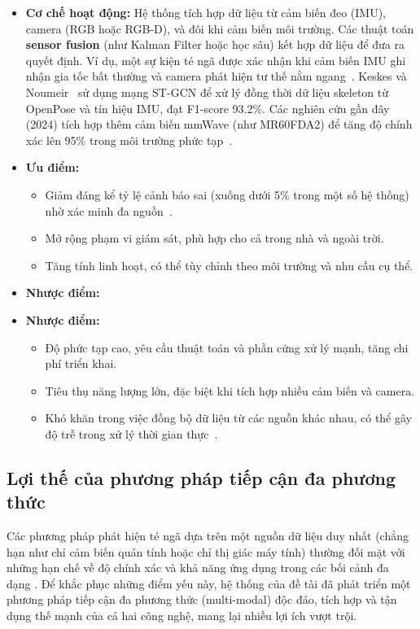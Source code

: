 \begin{itemize}
    \item \textbf{Cơ chế hoạt động:} Hệ thống tích hợp dữ liệu từ cảm biến đeo (IMU), camera (RGB hoặc RGB-D), và đôi khi cảm biến môi trường. Các thuật toán \textbf{sensor fusion} (như Kalman Filter hoặc học sâu) kết hợp dữ liệu để đưa ra quyết định. Ví dụ, một sự kiện té ngã được xác nhận khi cảm biến IMU ghi nhận gia tốc bất thường và camera phát hiện tư thế nằm ngang~\cite{rougier2011}. Keskes và Noumeir~\cite{keskes2021} sử dụng mạng ST-GCN để xử lý đồng thời dữ liệu skeleton từ OpenPose và tín hiệu IMU, đạt F1-score 93.2\%. Các nghiên cứu gần đây (2024) tích hợp thêm cảm biến mmWave (như MR60FDA2) để tăng độ chính xác lên 95\% trong môi trường phức tạp~\cite{mmwave2025}.
    \item \textbf{Ưu điểm:} 
    \begin{itemize}
        \item Giảm đáng kể tỷ lệ cảnh báo sai (xuống dưới 5\% trong một số hệ thống) nhờ xác minh đa nguồn~\cite{multimodal2024}.
        \item Mở rộng phạm vi giám sát, phù hợp cho cả trong nhà và ngoài trời.
        \item Tăng tính linh hoạt, có thể tùy chỉnh theo môi trường và nhu cầu cụ thể.
    \end{itemize}
    \item \textbf{Nhược điểm:}
    \item \textbf{Nhược điểm:}
    \begin{itemize}
        \item Độ phức tạp cao, yêu cầu thuật toán và phần cứng xử lý mạnh, tăng chi phí triển khai.
        \item Tiêu thụ năng lượng lớn, đặc biệt khi tích hợp nhiều cảm biến và camera.
        \item Khó khăn trong việc đồng bộ dữ liệu từ các nguồn khác nhau, có thể gây độ trễ trong xử lý thời gian thực~\cite{liu2018}.
    \end{itemize}
\end{itemize}

\subsection{Lợi thế của phương pháp tiếp cận đa phương thức}
Các phương pháp phát hiện té ngã dựa trên một nguồn dữ liệu duy nhất (chẳng hạn như chỉ cảm biến quán tính hoặc chỉ thị giác máy tính) thường đối mặt với những hạn chế về độ chính xác và khả năng ứng dụng trong các bối cảnh đa dạng \cite{researchgate_hybrid}. Để khắc phục những điểm yếu này, hệ thống của đề tài đã phát triển một phương pháp tiếp cận đa phương thức (multi-modal) độc đáo, tích hợp và tận dụng thế mạnh của cả hai công nghệ, mang lại nhiều lợi ích vượt trội.

